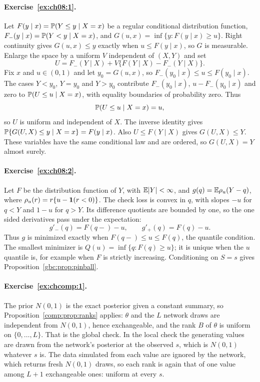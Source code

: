 \paragraph{Exercise~\ref{ex:ch08:1}.} Let $F(y \mid x) = \mathbb{P}(Y \le y \mid X = x)$ be a regular conditional distribution function, $F_-(y \mid x) = \mathbb{P}(Y < y \mid X = x)$, and $G(u, x) = \inf\{y : F(y \mid x) \ge u\}$. Right continuity gives $G(u, x) \le y$ exactly when $u \le F(y \mid x)$, so $G$ is measurable. Enlarge the space by a uniform $V$ independent of $(X, Y)$ and set
\[
U = F_-(Y \mid X) + V\{F(Y \mid X) - F_-(Y \mid X)\}.
\]
Fix $x$ and $u \in (0, 1)$ and let $y_0 = G(u, x)$, so $F_-(y_0 \mid x) \le u \le F(y_0 \mid x)$. The cases $Y < y_0$, $Y = y_0$ and $Y > y_0$ contribute $F_-(y_0 \mid x)$, $u - F_-(y_0 \mid x)$ and zero to $\mathbb{P}(U \le u \mid X = x)$, with equality boundaries of probability zero. Thus
\[
\mathbb{P}(U \le u \mid X = x) = u,
\]
so $U$ is uniform and independent of $X$. The inverse identity gives $\mathbb{P}\{G(U, X) \le y \mid X = x\} = F(y \mid x)$. Also $U \le F(Y \mid X)$ gives $G(U, X) \le Y$. These variables have the same conditional law and are ordered, so $G(U, X) = Y$ almost surely.

\paragraph{Exercise~\ref{ex:ch08:2}.} Let $F$ be the distribution function of $Y$, with $\mathbb{E}|Y| < \infty$, and $g(q) = \mathbb{E}\rho_u(Y - q)$, where $\rho_u(r) = r\{u - \mathbf{1}(r < 0)\}$. The check loss is convex in $q$, with slopes $-u$ for $q < Y$ and $1 - u$ for $q > Y$. Its difference quotients are bounded by one, so the one sided derivatives pass under the expectation:
\[
g'_-(q) = F(q-) - u, \qquad g'_+(q) = F(q) - u.
\]
Thus $g$ is minimized exactly when $F(q-) \le u \le F(q)$, the quantile condition. The smallest minimizer is $Q(u) = \inf\{q : F(q) \ge u\}$; it is unique when the $u$ quantile is, for example when $F$ is strictly increasing. Conditioning on $S = s$ gives Proposition~\ref{gbc:prop:pinball}.

\paragraph{Exercise~\ref{ex:chcomp:1}.} The prior $N(0, 1)$ is the exact posterior given a constant summary, so Proposition~\ref{comp:prop:ranks} applies: $\theta$ and the $L$ network draws are independent from $N(0, 1)$, hence exchangeable, and the rank $B$ of $\theta$ is uniform on $\{0, \dots, L\}$. That is the global check. In the local check the generating values are drawn from the network's posterior at the observed $s$, which is $N(0, 1)$ whatever $s$ is. The data simulated from each value are ignored by the network, which returns fresh $N(0, 1)$ draws, so each rank is again that of one value among $L + 1$ exchangeable ones: uniform at every $s$.

